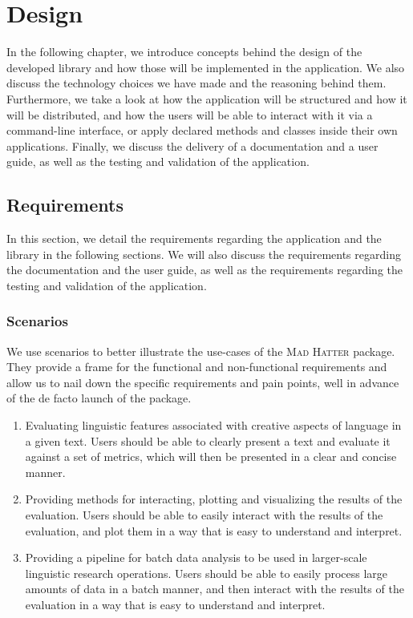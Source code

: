 \chapter{Design}
\label{chap:design}

In the following chapter, we introduce concepts behind the design of the developed library and how those will be implemented in the application. We also discuss the technology choices we have made and the reasoning behind them. Furthermore, we take a look at how the application will be structured and how it will be distributed, and how the users will be able to interact with it via a command-line interface, or apply declared methods and classes inside their own applications. Finally, we discuss the delivery of a documentation and a user guide, as well as the testing and validation of the application.

\section{Requirements}
In this section, we detail the requirements regarding the application and the library in the following sections. We will also discuss the requirements regarding the documentation and the user guide, as well as the requirements regarding the testing and validation of the application.

\subsection{Scenarios}
We use scenarios to better illustrate the use-cases of the \textsc{Mad Hatter} package. They provide a frame for the functional and non-functional requirements and allow us to nail down the specific requirements and pain points, well in advance of the de facto launch of the package.

\begin{enumerate}
    \item Evaluating linguistic features associated with creative aspects of language in a given text. Users should be able to clearly present a text and evaluate it against a set of metrics, which will then be presented in a clear and concise manner.
    \item Providing methods for interacting, plotting and visualizing the results of the evaluation. Users should be able to easily interact with the results of the evaluation, and plot them in a way that is easy to understand and interpret.
    \item Providing a pipeline for batch data analysis to be used in larger-scale linguistic research operations. Users should be able to easily process large amounts of data in a batch manner, and then interact with the results of the evaluation in a way that is easy to understand and interpret.
\end{enumerate}

